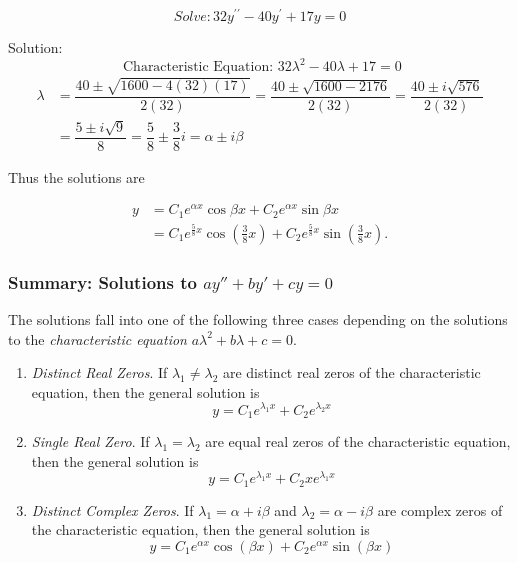   
  
  \begin{frame}
 \begin{example}
 \begin{equation*}
Solve:  32y^{\prime \prime }-40y^{\prime }+17y=0
 \end{equation*}
 \end{example}
 Solution: 
 \pause 
 \begin{equation*}
 \text{ Characteristic Equation: } 32\lambda ^{2}-40\lambda +17=0
 \end{equation*}
 \pause
 \begin{align*} 
 \lambda & =\dfrac{40\pm \sqrt{1600-4(32)(17)}}{2(32)} = \dfrac{40\pm 
 \sqrt{1600-2176}}{2(32)}=\dfrac{40\pm i\sqrt{576}}{2(32)}\\ & =\dfrac{5\pm 
 i\sqrt{9}}{8} =\dfrac{5}{8}\pm \dfrac{3}{8}i=\alpha \pm i\beta  
 \end{align*}  \pause 
 
 Thus the solutions are
 
 \begin{align*}
 y & = C_1e^{\alpha x}\cos \beta x+C_2e^{\alpha x}\sin \beta x\\ 
  & =C_1e^{\frac{5}{8}x}\cos\left( \frac{3}{8}x\right)+C_2 e^{\frac{5}{8}x}\sin\left( \frac{3}{8}x\right). 
 \end{align*}
 
 
  \end{frame}
  
  
  
  \begin{frame}
  \frametitle{Summary: Solutions to $ ay''+by'+cy=0 $}
  The solutions fall into one of the following three cases depending on the solutions to the \textit{characteristic equation} $ a\lambda^2+b\lambda +c = 0 $.
  
  \begin{enumerate}
  \item \textit{Distinct Real Zeros}. If $ \lambda_1\ne \lambda_2 $ are distinct real zeros of the characteristic equation, then the general solution is \[
  y=C_1 e^{\lambda_1 x}+ C_2 e^{\lambda_2 x}
  \]
    \item \textit{Single Real Zero}. If $ \lambda_1= \lambda_2 $ are equal real zeros of the characteristic equation, then the general solution is \[
    y=C_1 e^{\lambda_1 x}+ C_2 xe^{\lambda_1 x}
    \]
    \item \textit{Distinct Complex Zeros}. If $ \lambda_1=\alpha+i\beta$ and  $ \lambda_2=\alpha-i\beta $ are complex zeros of the characteristic equation, then the general solution is \[
    y=C_1 e^{\alpha x}\cos(\beta x)+ C_2 e^{\alpha x}\sin(\beta x)
    \]  
  \end{enumerate}
  
  
  
  \end{frame}
  
